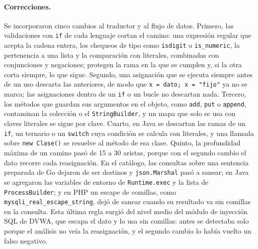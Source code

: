 \paragraph{Correcciones.} Se incorporaron cinco cambios al traductor y al
flujo de datos. Primero, las validaciones con \texttt{if} de cada
lenguaje cortan el camino: una expresión regular que acepta la cadena
entera, los chequeos de tipo como \texttt{isdigit} o \texttt{is\_numeric},
la pertenencia a una lista y la comparación con literales, combinadas
con conjunciones y negaciones; protegen la rama en la que se cumplen y,
si la otra corta siempre, lo que sigue. Segundo, una asignación que se
ejecuta siempre antes de un uso descarta las anteriores, de modo que
\texttt{x = dato; x = "fijo"} ya no se marca; las asignaciones dentro de
un \texttt{if} o un bucle no descartan nada. Tercero, los métodos que
guardan sus argumentos en el objeto, como \texttt{add}, \texttt{put} o
\texttt{append}, contaminan la colección o el \texttt{StringBuilder}, y un
mapa que solo se usa con claves literales se sigue por clave. Cuarto, en
Java se descartan las ramas de un \texttt{if}, un ternario o un
\texttt{switch} cuya condición se calcula con literales, y una llamada
sobre \texttt{new Clase()} se resuelve al método de esa clase. Quinto, la
profundidad máxima de un camino pasó de 15 a 30 aristas, porque con el
segundo cambio el dato recorre cada reasignación. En el catálogo, las
consultas sobre una sentencia preparada de Go dejaron de ser destinos y
\texttt{json.Marshal} pasó a sanear; en Java se agregaron las variables de
entorno de \texttt{Runtime.exec} y la lista de \texttt{ProcessBuilder};
y en PHP un escape de comillas, como \texttt{mysqli\_real\_escape\_string},
dejó de sanear cuando su resultado va sin comillas en la consulta. Esta
última regla surgió del nivel medio del módulo de inyección SQL de DVWA,
que escapa el dato y lo usa sin comillas: antes se detectaba solo porque
el análisis no veía la reasignación, y el segundo cambio lo había vuelto
un falso negativo.

